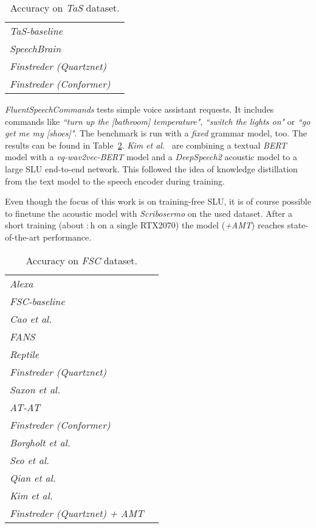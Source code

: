 \documentclass[a4paper]{article}
\begin{document}
\begin{table}[!htbp]
	\footnotesize
	\caption{Accuracy on \textit{TaS} dataset.}
	\vspace{-5pt}
	\label{tab:ben_tas}
	\centering
	\begin{tabular}{lc}
		\toprule
		\textit{TaS-baseline} \cite{TIASU} &  \\
		\textit{SpeechBrain} \cite{TASSB} &  \\
		\textit{Finstreder (Quartznet)} &  \\
		\textit{Finstreder (Conformer)} &  \\
		\bottomrule
	\end{tabular}
\end{table}

\vspace{9pt}
\textit{FluentSpeechCommands} \cite{FSC} tests simple voice assistant requests. It includes commands like  \textit{``turn up the [bathroom] temperature"},  \textit{``switch the lights on"} or \textit{``go get me my [shoes]"}. The benchmark is run with a \textit{fixed} grammar model, too. The results can be found in Table~\ref{tab:ben_fsc}.
\textit{Kim et al.}~\cite{TKNDIS} are combining a textual \textit{BERT} model with a \textit{vq-wav2vec-BERT} model and a \textit{DeepSpeech2} acoustic model to a large SLU end-to-end network. This followed the idea of knowledge distillation from the text model to the speech encoder during training.

Even though the focus of this work is on training-free SLU, it is of course possible to finetune the acoustic model with \textit{Scribosermo} on the used dataset. After a short training (about :\,h on a single RTX2070) the model (\textit{+AMT}) reaches state-of-the-art performance.

\begin{table}[!htbp]
	\footnotesize
	\caption{Accuracy on \textit{FSC} dataset.}
	\vspace{-5pt}
	\label{tab:ben_fsc}
	\centering
	\begin{tabular}{lc}
		\toprule
		\textit{Alexa} &  \\
		\textit{FSC-baseline} \cite{TIASU} &  \\
		\textit{Cao et al.} \cite{SEISL} &  \\
		\textit{FANS} \cite{FANS} &  \\
		\textit{Reptile} \cite{REPTIL} &  \\
		\textit{Finstreder (Quartznet)} &  \\
		\textit{Saxon et al.} \cite{EEGVA} &  \\
		\textit{AT-AT} \cite{ATAT} &  \\
		\textit{Finstreder (Conformer)} &  \\
		\textit{Borgholt et al.} \cite{DNASR} &  \\
		\textit{Seo et al.} \cite{PTNCTI} &  \\
		\textit{Qian et al.} \cite{SPLAPT} &  \\
		\textit{Kim et al.} \cite{TKNDIS} &  \\
		\textit{Finstreder (Quartznet) + AMT} &  \\
		\bottomrule
	\end{tabular}
\end{table}
\end{document}
